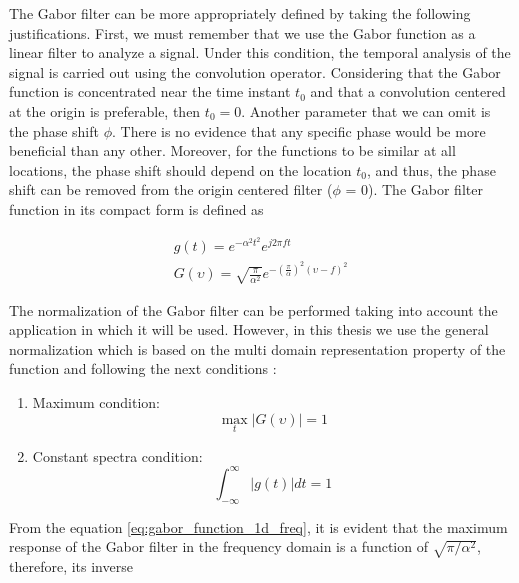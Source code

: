 The Gabor filter can be more appropriately defined by taking the following justifications. First, we must remember that we use the Gabor function as a linear filter to analyze a signal. Under this condition, the temporal analysis of the signal is carried out using the convolution operator. Considering that the Gabor function is concentrated near the time instant $t_0$ and that a convolution centered at the origin is preferable, then $t_0 = 0$. Another parameter that we can omit is the phase shift $\phi$. There is no evidence that any specific phase would be more beneficial than any other. Moreover, for the functions to be similar at all locations, the phase shift should depend on the location $t_0$, and thus, the phase shift can be removed from the origin centered filter ($\phi$ = 0). The Gabor filter function in its compact form is defined as 

\begin{equation}\label{eq:gabor_function_1d_timefreq_compact}
    \begin{gathered}
         g(t) =  e ^{-\alpha^2 t^2} e ^{j 2 \pi f t } \\
         G(\upsilon) =  \sqrt{\frac{\pi}{\alpha^2}} e ^{-\left(\frac{\pi}{\alpha}\right) ^{2} (\upsilon-f)^2} 
     \end{gathered}
\end{equation}

The normalization of the Gabor filter can be performed taking into account the application in which it will be used. However, in this thesis we use the general normalization which is based on the multi domain representation property of the function and following the next conditions \cite{Boukerroui.Noble.ea:JMIV:2004}:

\begin{enumerate}
    \item Maximum condition:
        \begin{equation}\label{eq:maximun_condition}
            \max_t{|G(\upsilon)|} = 1
        \end{equation}
    \item Constant spectra condition:
        \begin{equation}\label{eq:constant_energy_condition}
            \int_{-\infty}^{\infty} |g(t)| dt = 1
        \end{equation}        
\end{enumerate}

From the equation \eqref{eq:gabor_function_1d_freq}, it is evident that the maximum response of the Gabor filter in the frequency domain is a function of $\sqrt{\pi/\alpha^2}$, therefore, its inverse

